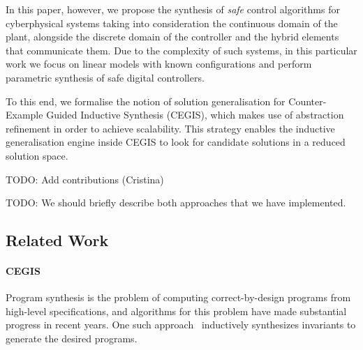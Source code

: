 \documentclass[runningheads,a4paper]{llncs}
\newcommand{\todo}[1]{{\color{red} TODO: #1}}
\begin{document}
In this paper, however, we propose the synthesis of \emph{safe} control algorithms for
cyberphysical systems taking into consideration the continuous domain
of the plant, alongside the discrete domain of the controller and the
hybrid elements that communicate them.
%
Due to the complexity of such systems, in this particular work we focus
on linear models with known configurations and perform parametric synthesis
of safe digital controllers.

To this end, we formalise the notion of solution generalisation for
Counter-Example Guided Inductive Synthesis (CEGIS), which makes use 
of abstraction refinement
in order to achieve scalability.
This strategy enables the inductive generalisation engine inside CEGIS
to look for candidate solutions in a reduced solution space.  %


\todo{Add contributions (Cristina)}

\todo{We should briefly describe both approaches that we have implemented.}

\subsection{Related Work}
\label{sec:relw}

\paragraph{CEGIS}

Program synthesis is the problem of computing correct-by-design programs
from high-level specifications, and algorithms for this problem have made
substantial progress in recent years.  One such
approach~\cite{itzhaky2010simple} inductively synthesizes invariants to
generate the desired programs.
\end{document}
